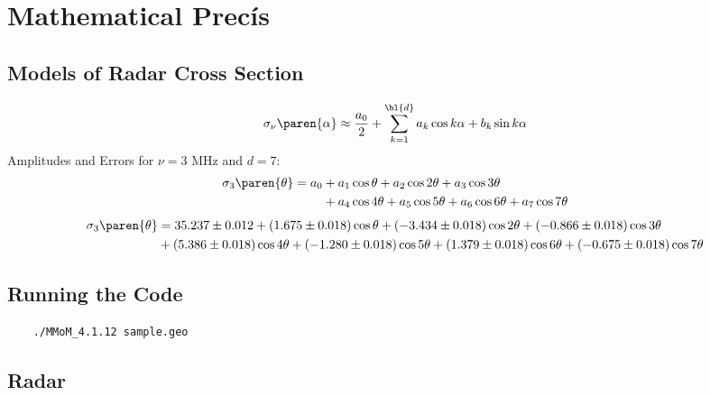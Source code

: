 % 

\section{Mathematical Prec\'is}

\subsection{Models of Radar Cross Section}

\begin{equation}
	\sigma_{\nu}\paren{\alpha}  \approx \dfrac{a_{0}}{2} + \sum_{k=1}^{\bl{d}}a_{k}\cos k\alpha + b_{k}\sin k\alpha
\label{eq:fourier}
\end{equation}
Amplitudes and Errors for $\nu=3$ MHz and $d=7$:
	\begin{equation*}
		\begin{split}
			\sigma_{3}\paren{\theta} = a_{0} &+  a_{1}\cos \theta  +  a_{2}\cos 2\theta +  a_{3}\cos 3\theta\\
				& +  a_{4}\cos 4\theta +  a_{5}\cos 5\theta+  a_{6}\cos 6\theta +  a_{7}\cos 7\theta
		\end{split}
	\end{equation*}	
	\begin{equation*}
		\begin{split}
			\sigma_{3}\paren{\theta} &= 35.237 \pm 0.012   +  (1.675 \pm 0.018) \cos \theta  +  (-3.434 \pm 0.018) \cos 2\theta  +  (-0.866 \pm 0.018) \cos 3\theta   \\
			&+  (5.386 \pm 0.018) \cos 4\theta  +  (-1.280 \pm 0.018) \cos 5\theta  +  (1.379 \pm 0.018) \cos 6\theta +   (-0.675 \pm 0.018) \cos 7\theta
		\end{split}
	\end{equation*}	
	

\subsection{Running the Code}

\begin{verbatim}
	./MMoM_4.1.12 sample.geo
\end{verbatim}

\subsection{Radar}

